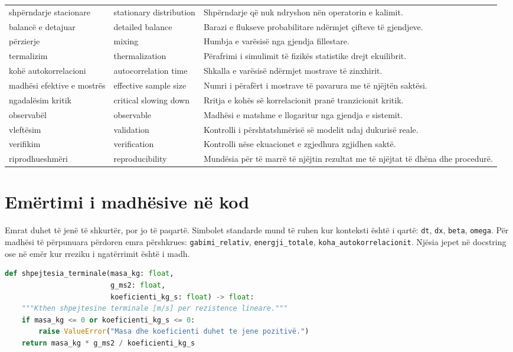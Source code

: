 \documentclass[11pt,oneside,openany]{book}
\begin{document}
\begin{longtable}{p{}p{}p{}}
shpërndarje stacionare & stationary distribution & Shpërndarje që nuk ndryshon nën operatorin e kalimit.\\
balancë e detajuar & detailed balance & Barazi e flukseve probabilitare ndërmjet çifteve të gjendjeve.\\
përzierje & mixing & Humbja e varësisë nga gjendja fillestare.\\
termalizim & thermalization & Përafrimi i simulimit të fizikës statistike drejt ekuilibrit.\\
kohë autokorrelacioni & autocorrelation time & Shkalla e varësisë ndërmjet mostrave të zinxhirit.\\
madhësi efektive e mostrës & effective sample size & Numri i përafërt i mostrave të pavarura me të njëjtën saktësi.\\
ngadalësim kritik & critical slowing down & Rritja e kohës së korrelacionit pranë tranzicionit kritik.\\
observabël & observable & Madhësi e matshme e llogaritur nga gjendja e sistemit.\\
vleftësim & validation & Kontrolli i përshtatshmërisë së modelit ndaj dukurisë reale.\\
verifikim & verification & Kontrolli nëse ekuacionet e zgjedhura zgjidhen saktë.\\
riprodhueshmëri & reproducibility & Mundësia për të marrë të njëjtin rezultat me të njëjtat të dhëna dhe procedurë.\\
\bottomrule
\end{longtable}
\normalsize

\section{Emërtimi i madhësive në kod}
Emrat duhet të jenë të shkurtër, por jo të paqartë. Simbolet standarde mund të ruhen kur konteksti është i qartë: \texttt{dt}, \texttt{dx}, \texttt{beta}, \texttt{omega}. Për madhësi të përpunuara përdoren emra përshkrues: \texttt{gabimi\_relativ}, \texttt{energji\_totale}, \texttt{koha\_autokorrelacionit}. Njësia jepet në docstring ose në emër kur rreziku i ngatërrimit është i madh.

\begin{lstlisting}[language=Python,caption={Funksion me kontratë të qartë numerike.}]
def shpejtesia_terminale(masa_kg: float,
                         g_ms2: float,
                         koeficienti_kg_s: float) -> float:
    """Kthen shpejtesine terminale [m/s] per rezistence lineare."""
    if masa_kg <= 0 or koeficienti_kg_s <= 0:
        raise ValueError("Masa dhe koeficienti duhet te jene pozitivë.")
    return masa_kg * g_ms2 / koeficienti_kg_s
\end{lstlisting}
\end{document}
